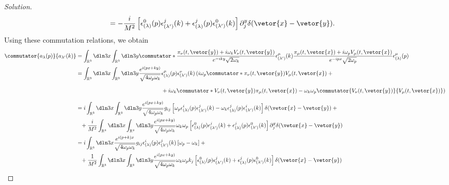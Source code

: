 \begin{proof}[Solution]
\begin{align*}
      &= -\frac{i}{M^2}\left[\epsilon^0_{(\lambda)}(p) \epsilon^j_{(\lambda')}(k)  + \epsilon^j_{(\lambda)}(p) \epsilon^0_{(\lambda')}(k)\right]\partial^y_j \delta(\vetor{x} - \vetor{y}).
   \end{align*}
   Using these commutation relations, we obtain
   \begin{align*}
      \commutator{a_{\lambda}(p)}{a_{\lambda'}(k)} 
      &= \int_{\mathbb{R}^3} \dln3x \int_{\mathbb{R}^3} \dln3y  \commutator*{\frac{\pi_\nu(t, \vetor{y}) + i \omega_k V_\nu(t, \vetor{y})}{e^{-iky}\sqrt{2\omega_k}}\epsilon^\mu_{(\lambda')}(k)}{\frac{\pi_\mu(t, \vetor{x}) + i \omega_p V_\mu(t, \vetor{x})}{e^{-ipx}\sqrt{2\omega_p}}\epsilon^\mu_{(\lambda)}(p)}\\
      &= \int_{\mathbb{R}^3}\dln3x \int_{\mathbb{R}^3} \dln3y \frac{e^{i(px + ky)}}{\sqrt{4\omega_p \omega_k}}\epsilon^\mu_{(\lambda)}(p) \epsilon^\nu_{(\lambda')}(k)\left(i \omega_p \commutator*{\pi_\nu(t, \vetor{y})}{V_{\mu}(t, \vetor{x})} +{}\right.\\
      &{}\phantom{=\int_{\mathbb{R}^3}\dln3x \int_{\mathbb{R}^3} \dln3y\frac{e^{i(px + ky)}}{\sqrt{4\omega_p \omega_k}}}\left.{}+ i \omega_k\commutator*{V_\nu(t, \vetor{y})}{\pi_{\mu}(t, \vetor{x})} - \omega_k \omega_p \commutator{V_\nu(t, \vetor{y})}{V_\mu(t, \vetor{x})}\right)\\
      &= i\int_{\mathbb{R}^3} \dln3x \int_{\mathbb{R}^3}\dln3y \frac{e^{i(px + ky)}}{\sqrt{4 \omega_p \omega_k}} g_{ij}\left[\omega_p \epsilon^i_{(\lambda)}(p) \epsilon^j_{(\lambda')}(k)  - \omega_k \epsilon^j_{(\lambda)}(p) \epsilon^i_{(\lambda')}(k) \right]\delta(\vetor{x} - \vetor{y})+{}\\
      &{}\phantom{=} + \frac{i}{M^2}\int_{\mathbb{R}^3} \dln3x \int_{\mathbb{R}^3} \dln3y \frac{e^{i(px + ky)}}{\sqrt{4 \omega_p \omega_k}} \omega_k \omega_p\left[\epsilon^0_{(\lambda)}(p) \epsilon^j_{(\lambda')}(k) + \epsilon^j_{(\lambda)}(p) \epsilon^0_{(\lambda')}(k)\right] \partial_j^y \delta(\vetor{x} - \vetor{y})\\
      &= i\int_{\mathbb{R}^3} \dln3x \frac{e^{i(p + k)x}}{\sqrt{4 \omega_p \omega_k}} g_{ij}\epsilon^i_{(\lambda)}(p) \epsilon^j_{(\lambda')}(k)\left[\omega_p - \omega_k  \right] + {}\\
      &{}\phantom{=} + \frac{1}{M^2}\int_{\mathbb{R}^3}\dln3x \int_{\mathbb{R}^3}\dln3y\frac{e^{i(px + ky)}}{\sqrt{4 \omega_p \omega_k}} \omega_k \omega_p k_j \left[\epsilon^0_{(\lambda)}(p) \epsilon^j_{(\lambda')}(k) + \epsilon^j_{(\lambda)}(p) \epsilon^0_{(\lambda')}(k)\right]\delta(\vetor{x} - \vetor{y})\\

\end{align*}
\end{proof}
